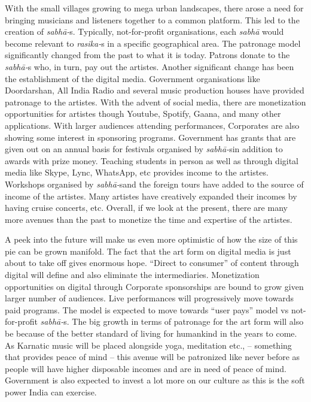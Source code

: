 With the small villages growing to mega urban landscapes, there arose a need for bringing musicians and listeners together to a common platform. This led to the creation of \textit{sabhā-}s. Typically, not-for-profit organisations, each \textit{sabhā} would become relevant to\textit{ rasika-}s in a specific geographical area. The patronage model significantly changed from the past to what it is today. Patrons donate to the \textit{sabhā-}s who, in turn, pay out the artistes. Another significant change has been the establishment of the digital media. Government organisations like Doordarshan, All India Radio and several music production houses have provided patronage to the artistes. With the advent of social media, there are monetization opportunities for artistes though Youtube, Spotify, Gaana, and many other applications. With larger audiences attending performances, Corporates are also showing some interest in sponsoring programs. Government has grants that are given out on an annual basis for festivals organised by \textit{sabhā-}sin addition to awards with prize money. Teaching students in person as well as through digital media like Skype, Lync, WhatsApp, etc provides income to the artistes. Workshops organised by \textit{sabhā-}s\break and the foreign tours have added to the source of income of the artistes. Many artistes have creatively expanded their incomes by having cruise concerts, etc. Overall, if we look at the present, there are many more avenues than the past to monetize the time and expertise of the artistes.

A peek into the future will make us even more optimistic of how the size of this pie can be grown manifold. The fact that the art form on digital media is just about to take off gives enormous hope. “Direct to consumer” of content through digital will define and also eliminate the intermediaries. Monetization opportunities on digital through Corporate sponsorships are bound to grow given larger number of audiences. Live performances will progressively move towards paid programs. The model is expected to move towards “user pays” model vs not-for-profit \textit{sabhā-}s. The big growth in terms of patronage for the art form will also be because of the better standard of living for humankind in the years to come. As Karnatic music will be placed alongside yoga, meditation etc., – something that provides peace of mind – this avenue will be patronized like never before as people will have higher disposable incomes and are in need of peace of mind. Government is also expected to invest a lot more on our culture as this is the soft power India can exercise.

